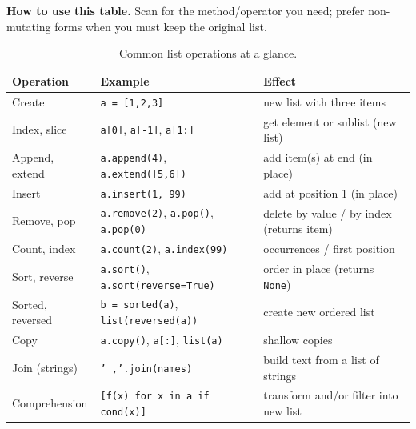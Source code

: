 
\begin{NoteBox}
\textbf{How to use this table.} Scan for the method/operator you need; prefer non-mutating forms when you must keep the original list.
\end{NoteBox}
\renewcommand{\arraystretch}{1.2}
\begin{table}[h]
\centering
\begin{tabularx}{\textwidth}{|l|X|X|}
\hline
\textbf{Operation} & \textbf{Example} & \textbf{Effect} \\ \hline
Create            & \texttt{a = [1,2,3]}                 & new list with three items \\ \hline
Index, slice      & \texttt{a[0]}, \texttt{a[-1]}, \texttt{a[1:]} & get element or sublist (new list) \\ \hline
Append, extend    & \texttt{a.append(4)}, \texttt{a.extend([5,6])} & add item(s) at end (in place) \\ \hline
Insert            & \texttt{a.insert(1, 99)}              & add at position 1 (in place) \\ \hline
Remove, pop       & \texttt{a.remove(2)}, \texttt{a.pop()}, \texttt{a.pop(0)} & delete by value / by index (returns item) \\ \hline
Count, index      & \texttt{a.count(2)}, \texttt{a.index(99)} & occurrences / first position \\ \hline
Sort, reverse     & \texttt{a.sort()}, \texttt{a.sort(reverse=True)} & order in place (returns \texttt{None}) \\ \hline
Sorted, reversed  & \texttt{b = sorted(a)}, \texttt{list(reversed(a))} & create new ordered list \\ \hline
Copy              & \texttt{a.copy()}, \texttt{a[:]}, \texttt{list(a)} & shallow copies \\ \hline
Join (strings)    & \texttt{' ,'.join(names)}             & build text from a list of strings \\ \hline
Comprehension     & \texttt{[f(x) for x in a if cond(x)]} & transform and/or filter into new list \\ \hline
\end{tabularx}
\caption{Common list operations at a glance.}
\end{table}

